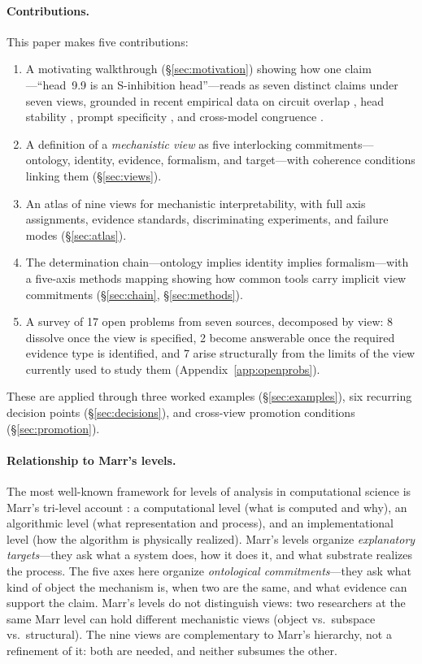 \documentclass{article}
\begin{document}
\paragraph{Contributions.}
This paper makes five contributions:
\begin{enumerate}[leftmargin=*]
\item A motivating walkthrough (\S\ref{sec:motivation}) showing how one
      claim---``head~9.9 is an S-inhibition head''---reads as seven
      distinct claims under seven views, grounded in recent empirical
      data on circuit overlap \citep{merullo2024}, head stability
      \citep{bali2026}, prompt specificity \citep{franco2026}, and
      cross-model congruence \citep{sun2026}.
\item A definition of a \emph{mechanistic view} as five interlocking
      commitments---ontology, identity, evidence, formalism, and
      target---with coherence conditions linking them
      (\S\ref{sec:views}).
\item An atlas of nine views for mechanistic interpretability,
      with full axis assignments, evidence standards, discriminating
      experiments, and failure modes (\S\ref{sec:atlas}).
\item The determination chain---ontology implies identity implies
      formalism---with a five-axis methods mapping showing how common
      tools carry implicit view commitments
      (\S\ref{sec:chain}, \S\ref{sec:methods}).
\item A survey of 17 open problems from seven sources, decomposed by
      view: 8 dissolve once the view is specified, 2 become answerable
      once the required evidence type is identified, and 7 arise
      structurally from the limits of the view currently used to study
      them (Appendix~\ref{app:openprobs}).
\end{enumerate}
These are applied through three worked examples (\S\ref{sec:examples}),
six recurring decision points (\S\ref{sec:decisions}), and
cross-view promotion conditions (\S\ref{sec:promotion}).

\paragraph{Relationship to Marr's levels.}
The most well-known framework for levels of analysis in computational
science is Marr's tri-level account \citep{marr1982}: a computational
level (what is computed and why), an algorithmic level (what
representation and process), and an implementational level (how the
algorithm is physically realized).  Marr's levels organize
\emph{explanatory targets}---they ask what a system does, how it does
it, and what substrate realizes the process.  The five axes here
organize \emph{ontological commitments}---they ask what kind of object
the mechanism is, when two are the same, and what evidence can support
the claim.  Marr's levels do not distinguish views: two researchers
at the same Marr level can hold different mechanistic views (object vs.\
subspace vs.\ structural).  The nine views are complementary to Marr's
hierarchy, not a refinement of it: both are needed, and neither
subsumes the other.
\end{document}

